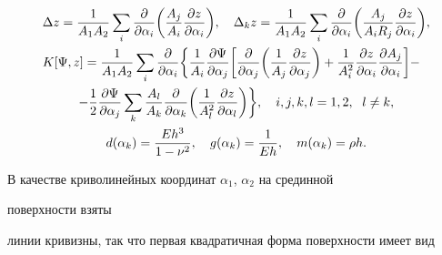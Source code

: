 \begin{gather} 


\begin{split} 


&\Delta z=\frac{1}{A_1A_2}\sum_i 


\frac{\partial}{\partial\alpha_i}\biggl( 


\frac{A_j}{A_i}\frac{\partial z}{\partial\alpha_i}\biggr),\quad 


\Delta_kz=\frac{1}{A_1A_2}\sum_i 


\frac{\partial}{\partial\alpha_i}\biggl( 


\frac{A_j}{A_iR_j}\frac{\partial z}{\partial\alpha_i}\biggr),\\ 


%


&K[\Psi,z]=\frac{1}{A_1A_2}\sum_i\frac{\partial}{\partial\alpha_i} 


\biggl\{\frac{1}{A_i}\frac{\partial\Psi}{\partial\alpha_j} 


\biggl[\frac{\partial}{\partial\alpha_j} 


\biggl(\frac{1}{A_j}\frac{\partial z}{\partial\alpha_j}\biggr) 


+\frac{1}{A^2_i}\frac{\partial z}{\partial\alpha_i} 


\frac{\partial A_j}{\partial\alpha_i}\biggr]- 


\end{split} \\


%


-\frac{1}{2}\frac{\partial \Psi}{\partial\alpha_j}\sum_k 


\frac{A_l}{A_k}\frac{\partial}{\partial\alpha_k}\biggl( 


\frac{1}{A^2_l}\frac{\partial z}{\partial\alpha_l}\biggr)\biggr\}, 


\quad i,j,k,l=1,2,\ \; l\ne k, \notag \\ 


%


d(\alpha_k)=\frac{Eh^3}{1-\nu^2},\quad g(\alpha_k)=\frac{1}{Eh}, 


\quad m(\alpha_k)=\rho h. \notag 


\end{gather} 


В качестве криволинейных координат $\alpha_1$, $\alpha_2$ на срединной 


поверхности взяты 


линии кривизны, так что первая квадратичная форма поверхности имеет вид 


